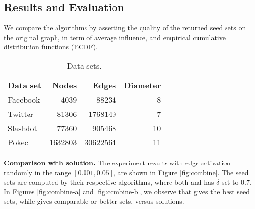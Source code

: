 \subsection{Results and Evaluation}
We compare the algorithms by asserting the quality of the
returned seed sets on the original graph, in term of average influence, and empirical cumulative
distribution functions (ECDF).
%
\begin{table}
\caption{Data sets.}
\label{tb:1}
\centering
\begin{tabular}{lrrr}
\toprule
Data set & Nodes & Edges & Diameter \\
\midrule
Facebook & 4039 & 88234 & 8 \\
Twitter & 81306 & 1768149 & 7 \\
Slashdot & 77360 & 905468 & 10 \\
Pokec & 1632803 & 30622564 & 11 \\
\bottomrule
\end{tabular}
\end{table}

\smallskip
\noindent
\textbf{Comparison with \expinf{} solution.}
The experiment results with edge activation randomly in the range
$[0.001, 0.05]$, are shown in Figure \ref{fig:combine}.
The seed sets are computed by their
respective algorithms, where both \infprobheu{} and \multicritalgo{} has $\delta$ set to $0.7$.
In Figures \ref{fig:combine-a} and \ref{fig:combine-b}, we observe that
\multicritalgo{} gives the best seed sets, while \infprobheu{} gives comparable or better sets,
versus \infmax{} solutions.


